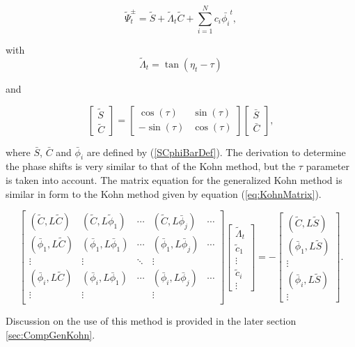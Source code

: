 \documentclass[Dissertation.tex]{subfiles}
\begin{document}
\begin{equation}
\tilde{\Psi}_t^\pm = \tilde{S} + \tilde{\Lambda}_t \tilde{C} + \sum_{i=1}^N c_i \bar{\phi_i}^t ,
\label{eq:TrialSimpleGeneral}
\end{equation}

\noindent with
\begin{equation}
\label{eq:GenKohnDef}
\tilde{\Lambda}_t = \tan(\eta_t-\tau)
\end{equation}

\noindent and

\begin{equation}
\begin{bmatrix}
\tilde{S} \\
\tilde{C}
\end{bmatrix}
=
\begin{bmatrix}
\cos(\tau) & \sin(\tau) \\
-\sin(\tau) & \cos(\tau)
\end{bmatrix}
\begin{bmatrix}
\bar{S} \\
\bar{C}
\end{bmatrix},
\end{equation}


\noindent where $\bar{S}$, $\bar{C}$ and $\bar{\phi}_i$ are defined by (\ref{SCphiBarDef}).  The derivation to determine the phase shifts is very similar to that of the Kohn method, but the $\tau$ parameter is taken into account.  The matrix equation for the generalized Kohn method is similar in form to the Kohn method given by equation (\ref{eq:KohnMatrix}).

\begin{equation}
\label{eq:GenKohnMatrix}
\begin{bmatrix} 
 (\tilde{C},L\tilde{C}) & (\tilde{C},L\tilde{\phi}_1) & \cdots & (\tilde{C},L\bar{\phi}_j) & \cdots\\
 (\bar{\phi}_1,L\tilde{C}) & (\bar{\phi}_1,L\bar{\phi}_1) & \cdots & (\bar{\phi}_1,L\bar{\phi}_j) & \cdots\\
 \vdots & \vdots & \ddots & \vdots \\
 (\bar{\phi}_i,L\tilde{C}) & (\bar{\phi}_i,L\bar{\phi}_1) & \cdots & (\bar{\phi}_i,L\bar{\phi}_j) & \cdots\\
 \vdots & \vdots & & \vdots & \\
\end{bmatrix}
\begin{bmatrix}
\tilde{\Lambda}_t\\
\tilde{c}_1\\
\vdots\\
\tilde{c}_i\\
\vdots
\end{bmatrix}
= -
\begin{bmatrix}
(\tilde{C},L\tilde{S}) \\
(\bar{\phi}_1,L\tilde{S}) \\
\vdots \\
(\bar{\phi}_i,L\tilde{S}) \\
\vdots
\end{bmatrix}.
\end{equation}

Discussion on the use of this method is provided in the later section \ref{sec:CompGenKohn}.
\end{document}

